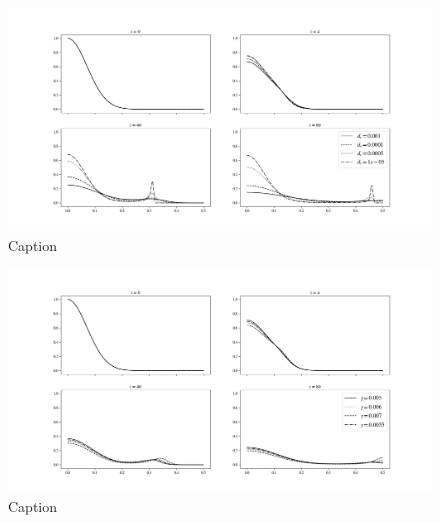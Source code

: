 \begin{figure}[t]
    \centering
    \includegraphics[width=\textwidth]{resources/images/dc_comparison.png}
    \caption{Caption}
    \label{fig:dc_comparison}
\end{figure}

\begin{figure}[t]
    \centering
    \includegraphics[width=\textwidth]{resources/images/gamma_comparison.png}
    \caption{Caption}
    \label{fig:gamma_comparison}
\end{figure}

